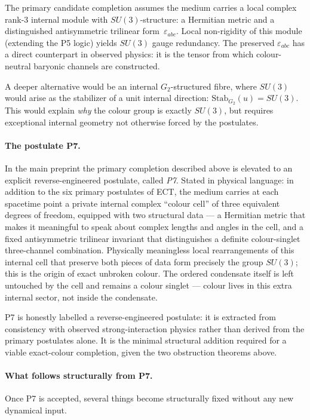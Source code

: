 \documentclass[11pt,a4paper]{article}
\begin{document}
The primary candidate completion assumes the medium carries a local complex rank-3 internal module with $SU(3)$-structure: a Hermitian metric and a distinguished antisymmetric trilinear form~$\varepsilon_{abc}$. Local non-rigidity of this module (extending the P5 logic) yields $SU(3)$ gauge redundancy. The preserved $\varepsilon_{abc}$ has a direct counterpart in observed physics: it is the tensor from which colour-neutral baryonic channels are constructed.

A deeper alternative would be an internal $G_2$-structured fibre, where $SU(3)$ would arise as the stabilizer of a unit internal direction: $\mathrm{Stab}_{G_2}(u) = SU(3)$. This would explain \emph{why} the colour group is exactly $SU(3)$, but requires exceptional internal geometry not otherwise forced by the postulates.

\paragraph{The postulate P7.} In the main preprint the primary completion described above is elevated to an explicit reverse-engineered postulate, called \emph{P7}. Stated in physical language: in addition to the six primary postulates of ECT, the medium carries at each spacetime point a private internal complex ``colour cell'' of three equivalent degrees of freedom, equipped with two structural data --- a Hermitian metric that makes it meaningful to speak about complex lengths and angles in the cell, and a fixed antisymmetric trilinear invariant that distinguishes a definite colour-singlet three-channel combination. Physically meaningless local rearrangements of this internal cell that preserve both pieces of data form precisely the group $SU(3)$; this is the origin of exact unbroken colour. The ordered condensate itself is left untouched by the cell and remains a colour singlet --- colour lives in this extra internal sector, not inside the condensate.

P7 is honestly labelled a reverse-engineered postulate: it is extracted from consistency with observed strong-interaction physics rather than derived from the primary postulates alone. It is the minimal structural addition required for a viable exact-colour completion, given the two obstruction theorems above.

\paragraph{What follows structurally from P7.} Once P7 is accepted, several things become structurally fixed without any new dynamical input.
\end{document}

